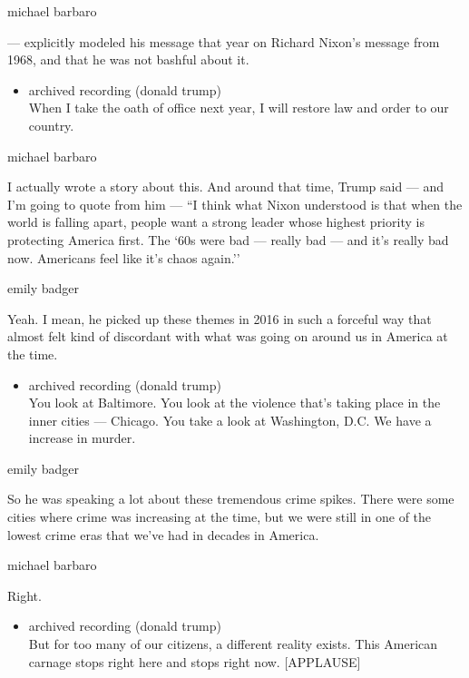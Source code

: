 michael barbaro

--- explicitly modeled his message that year on Richard Nixon's message
from 1968, and that he was not bashful about it.

\begin{itemize}
\tightlist
\item
  archived recording (donald trump)\\
  When I take the oath of office next year, I will restore law and order
  to our country.
\end{itemize}

michael barbaro

I actually wrote a story about this. And around that time, Trump said
--- and I'm going to quote from him --- ``I think what Nixon understood
is that when the world is falling apart, people want a strong leader
whose highest priority is protecting America first. The `60s were bad
--- really bad --- and it's really bad now. Americans feel like it's
chaos again.''

emily badger

Yeah. I mean, he picked up these themes in 2016 in such a forceful way
that almost felt kind of discordant with what was going on around us in
America at the time.

\begin{itemize}
\tightlist
\item
  archived recording (donald trump)\\
  You look at Baltimore. You look at the violence that's taking place in
  the inner cities --- Chicago. You take a look at Washington, D.C. We
  have a increase in murder.
\end{itemize}

emily badger

So he was speaking a lot about these tremendous crime spikes. There were
some cities where crime was increasing at the time, but we were still in
one of the lowest crime eras that we've had in decades in America.

michael barbaro

Right.

\begin{itemize}
\tightlist
\item
  archived recording (donald trump)\\
  But for too many of our citizens, a different reality exists. This
  American carnage stops right here and stops right now. {[}APPLAUSE{]}
\end{itemize}

